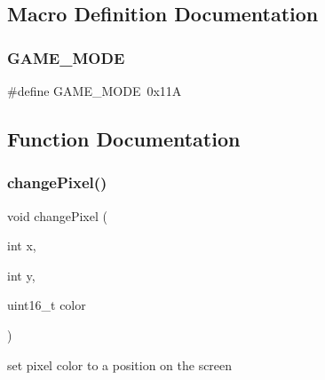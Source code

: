 \subsection{Macro Definition Documentation}
\mbox{\label{group__video_ga0e6eed752f69ec92baec7d38a6ff3f04}} 
\subsubsection{\texorpdfstring{GAME\_MODE}{GAME\_MODE}}
{\footnotesize\ttfamily \#define G\+A\+M\+E\+\_\+\+M\+O\+DE~0x11A}



\subsection{Function Documentation}
\mbox{\label{group__video_gaad3b8372cfabe442562c9c5d6e4db348}} 
\subsubsection{\texorpdfstring{changePixel()}{changePixel()}}
{\footnotesize\ttfamily void change\+Pixel (\begin{DoxyParamCaption}\item[{int}]{x,  }\item[{int}]{y,  }\item[{uint16\+\_\+t}]{color }\end{DoxyParamCaption})}



set pixel color to a position on the screen 


